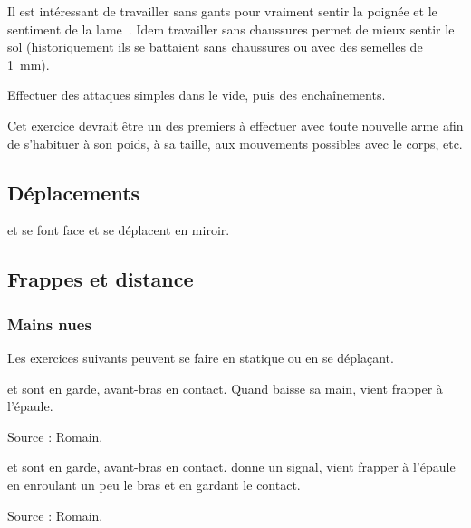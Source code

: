Il est intéressant de travailler sans gants pour vraiment sentir la poignée et le sentiment de la lame~\cite{enzi:dijon:messer_inner:2015}.
Idem travailler sans chaussures permet de mieux sentir le sol (historiquement ils se battaient sans chaussures ou avec des semelles de \SI{1}{mm}).


\begin{exercice}
Effectuer des attaques simples dans le vide, puis des enchaînements.

Cet exercice devrait être un des premiers à effectuer avec toute nouvelle arme afin de s'habituer à son poids, à sa taille, aux mouvements possibles avec le corps, etc.
\end{exercice}


\subsection{Déplacements}


\begin{exercice}
\label{ex:general:miroir}

\A et \D se font face et se déplacent en miroir.
\end{exercice}


\subsection{Frappes et distance}


\subsubsection{Mains nues}


Les exercices suivants peuvent se faire en statique ou en se déplaçant.


\begin{exercice}
\label{struct:ex:contact:frappe-signal}

\A et \D sont en garde, avant-bras en contact.
Quand \A baisse sa main, \D vient frapper à l'épaule.

Source : Romain.

\end{exercice}


\begin{exercice}

\A et \D sont en garde, avant-bras en contact.
\A donne un signal, \D vient frapper à l'épaule en enroulant un peu le bras et en gardant le contact.

Source : Romain.

\end{exercice}


